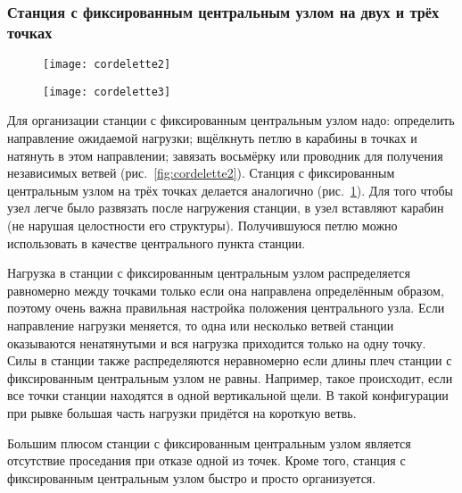 \documentclass[fleqn, 12pt]{extarticle}
\begin{document}
    \subsubsection{Станция с фиксированным центральным узлом на двух и трёх точках}
    \begin{figure}[h]
        \centering
        \begin{minipage}[t]{0.45\textwidth}
            \centering
            \texttt{[image: cordelette2]}
            \label{fig:cordelette2}
        \end{minipage}\hspace{0.05\textwidth} 
        \begin{minipage}[t]{0.45\textwidth}
            \texttt{[image: cordelette3]}
            \label{fig:cordelette3}
        \end{minipage}
    \end{figure}
    Для организации станции с фиксированным центральным узлом надо: определить направление ожидаемой нагрузки; вщёлкнуть петлю в карабины в точках и натянуть в этом направлении;
    завязать восьмёрку или проводник для получения независимых ветвей (рис.~\ref{fig:cordelette2}).
    Станция с фиксированным центральным узлом на трёх точках делается аналогично (рис.~\ref{fig:cordelette3}).
    Для того чтобы узел легче было развязать после нагружения станции,
    в узел вставляют карабин (не нарушая целостности его структуры). Получившуюся петлю можно использовать в качестве центрального пункта станции.
    
    Нагрузка в станции с фиксированным центральным узлом распределяется равномерно между точками только если она направлена определённым образом,
    поэтому очень важна правильная настройка положения центрального узла. Если направление нагрузки меняется, то одна или несколько ветвей станции оказываются ненатянутыми и вся нагрузка приходится
    только на одну точку. Силы в станции также распределяются неравномерно если длины плеч станции с фиксированным центральным узлом не равны.
    Например, такое происходит, если все точки станции находятся в одной вертикальной щели.
    В такой конфигурации при рывке большая часть нагрузки придётся на короткую ветвь.
    
    Большим плюсом станции с фиксированным центральным узлом является отсутствие проседания при отказе одной из точек. Кроме того, станция с фиксированным центральным узлом
    быстро и просто организуется.
\end{document}
